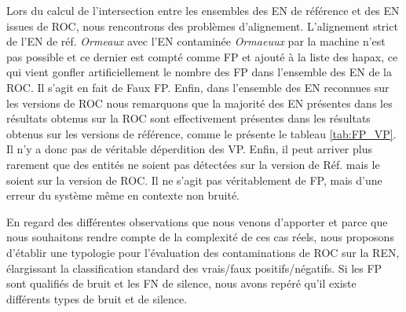 Lors du calcul de l'intersection entre les ensembles des EN de référence et des EN issues de ROC, nous rencontrons des problèmes d'alignement. L'alignement strict de l'EN de réf. \textit{Ormeaux} avec l'EN contaminée \textit{Ormaeuux} par la machine n'est pas possible et ce dernier est compté comme FP et ajouté à la liste des hapax, ce qui vient gonfler artificiellement le nombre des FP dans l'ensemble des EN de la ROC. Il s'agit en fait de Faux FP. Enfin, dans l'ensemble des EN reconnues sur les versions de ROC nous remarquons que la majorité des EN présentes dans les résultats obtenus sur la ROC sont effectivement présentes dans les résultats obtenus sur les versions de référence, comme le présente le tableau \ref{tab:FP_VP}. Il n'y a donc pas de véritable déperdition des VP. Enfin, il peut arriver plus rarement que des entités ne soient pas détectées sur la version de Réf. mais le soient sur la version de ROC. Il ne s'agit pas véritablement de FP, mais d'une erreur du système même en contexte non bruité.



En regard des différentes observations que nous venons d'apporter et parce que nous souhaitons rendre compte de la complexité de ces cas réels, nous proposons d'établir une typologie pour l'évaluation des contaminations de ROC sur la REN, élargissant la classification standard des vrais/faux positifs/négatifs. Si les FP sont qualifiés de bruit et les FN de silence, nous avons repéré qu'il existe différents types de bruit et de silence. %


